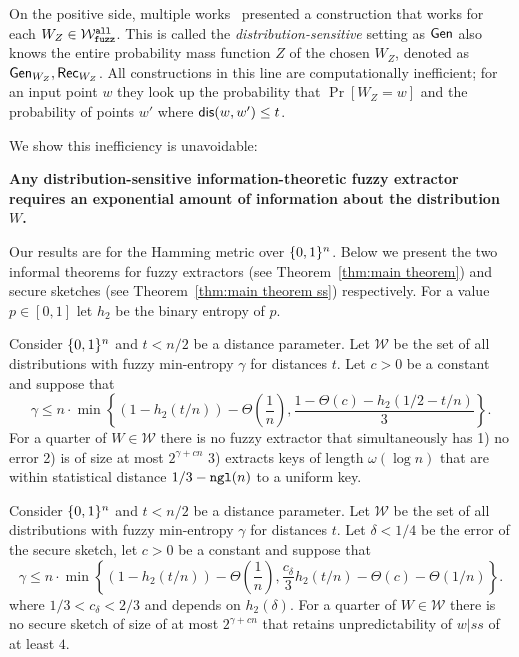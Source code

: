 On the positive side, multiple works~\cite{hayashi2014secret,hayashi2016secret,fuller2016fuzzy,woodage2017new,tyagi2017universal,TVW18,LA18,fuller2019continuous,fuller2020fuzzy} presented a construction that works for each $W_Z\in \mathcal{W}_{\mathtt{fuzz}}^{\mathtt{all}}$.  This is called the \emph{distribution-sensitive} setting as ${\mathsf{Gen}}$ also knows the entire probability mass function $Z$ of the chosen $W_Z$, denoted as ${\mathsf{Gen}}_{W_Z}, {\mathsf{Rec}}_{W_Z}$.  All constructions in this line are computationally inefficient; for an input point $w$ they look up the probability that $\Pr[W_Z=w]$ and the probability of points $w'$ where $\mathsf{dis}(w, w')\le t$.  

We show this inefficiency is unavoidable:
\begin{displayquote}
\textbf{Any distribution-sensitive information-theoretic fuzzy extractor requires an exponential amount of information about the distribution $W$.} 
\end{displayquote} 
Our results are for the Hamming metric over $\{0, 1\}^n$. Below we present the two informal theorems for fuzzy extractors (see Theorem~\ref{thm:main theorem}) and secure sketches (see Theorem~\ref{thm:main theorem ss}) respectively.  For a value $p\in [0,1]$ let $h_2$ be the binary entropy of $p$. 

\begin{theorem}
Consider $\{0, 1\}^n$ and $t< n/2$ be a distance parameter.  Let $\mathcal{W}$ be the set of all distributions with fuzzy min-entropy $\gamma$ for distances $t$.  Let $c>0$ be a constant and suppose that \[
\gamma \le n\cdot\min\left\{(1-h_2(t/n)) - \Theta\left(\frac{1}{n}\right), \frac{1-\Theta(c)-h_2(1/2-t/n)}{3}\right\}.
\]
 For a quarter of $W \in \mathcal{W}$ there is no fuzzy extractor that simultaneously has 1) no error 2) is of size at most $2^{\gamma+cn}$ 3) extracts keys of length $\omega(\log n)$ that are within statistical distance $1/3-\mathtt{ngl}(n)$ to a uniform key.
\end{theorem}

\begin{theorem}
Consider $\{0, 1\}^n$ and $t< n/2$ be a distance parameter.  Let $\mathcal{W}$ be the set of all distributions with fuzzy min-entropy $\gamma$ for distances $t$.  Let $\delta<1/4$ be the error of the secure sketch, let $c>0$ be a constant and suppose that \[
\gamma \le n\cdot\min\left\{(1-h_2(t/n)) - \Theta\left(\frac{1}{n}\right), \frac{c_\delta}{3}h_2(t/n)-\Theta(c)-\Theta(1/n)\right\}.
\]
where $1/3< c_\delta <2/3$ and depends on $h_2(\delta)$. 
 For a quarter of $W \in \mathcal{W}$ there is no secure sketch of
size of at most $2^{\gamma+cn}$ that
 retains unpredictability of $w|ss$ of at  least $4$.
\end{theorem}

